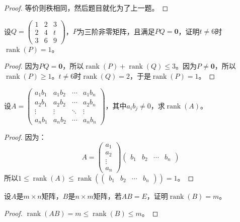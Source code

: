 \begin{proof}
	等价则秩相同，然后题目就化为了上一题。
\end{proof}
\begin{theorem}
	设$Q=
	\begin{pmatrix}
		1 & 2 & 3 \\
		2 & 4 & t \\
		3 & 6 & 9
	\end{pmatrix}$，$P$为三阶非零矩阵，且满足$PQ=\mathbf{0}$，证明$t\ne6$时$\operatorname{rank}(P)=1$。
\end{theorem}
\begin{proof}
	因为$PQ=\mathbf{0}$，所以$\operatorname{rank}(P)+\operatorname{rank}(Q)\leqslant3$。因为$P\ne\mathbf{0}$，所以$\operatorname{rank}(P)\geqslant1$。$t\ne 6$时$\operatorname{rank}(Q)=2$，于是$\operatorname{rank}(P)=1$。
\end{proof}
\begin{theorem}
	设$A=
	\begin{pmatrix}
		a_1b_1 & a_1b_2 & \cdots & a_1b_n \\
		a_2b_1 & a_2b_2 & \cdots & a_2b_n \\
		\vdots & \vdots & \ddots & \vdots \\
		a_nb_1 & a_nb_2 & \cdots & a_nb_n 
	\end{pmatrix}$，其中$a_ib_j\ne0$，求$\operatorname{rank}(A)$。
\end{theorem}
\begin{proof}
	因为：
	\begin{equation*}
		A=
		\begin{pmatrix}
			a_1 \\
			a_2 \\
			\vdots \\
			a_n
		\end{pmatrix}
		\begin{pmatrix}
			b_1 & b_2 & \cdots & b_n
		\end{pmatrix}
	\end{equation*}
	所以$1\leqslant\operatorname{rank}(A)\leqslant\operatorname{rank}
	\left(\begin{pmatrix}
		b_1 & b_2 & \cdots & b_n
	\end{pmatrix}\right)=1$。
\end{proof}
\begin{theorem}
	设$A$是$m\times n$矩阵，$B$是$n\times m$矩阵，若$AB=E$，证明$\operatorname{rank}(B)=m$。
\end{theorem}
\begin{proof}
	$\operatorname{rank}(AB)=m\leqslant\operatorname{rank}(B)\leqslant m$。
\end{proof}
